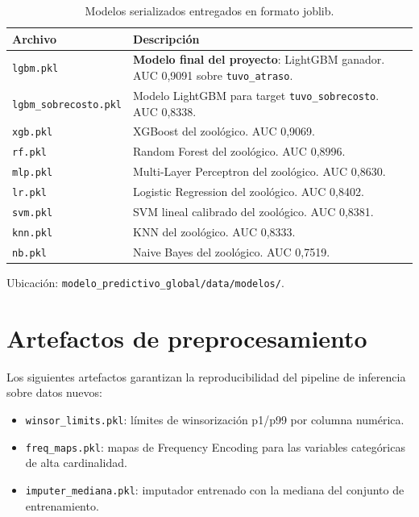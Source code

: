 \documentclass[12pt,letterpaper,oneside]{report}
\begin{document}
\begin{table}[H]
\centering
\caption{Modelos serializados entregados en formato joblib.}
\label{tab:modelos_entregados}
\small
\begin{tabular}{p{4cm}p{10cm}}
\toprule
\textbf{Archivo} & \textbf{Descripción} \\
\midrule
\texttt{lgbm.pkl} & \textbf{Modelo final del proyecto}: LightGBM ganador. AUC 0,9091 sobre \texttt{tuvo\_atraso}. \\
\texttt{lgbm\_sobrecosto.pkl} & Modelo LightGBM para target \texttt{tuvo\_sobrecosto}. AUC 0,8338. \\
\texttt{xgb.pkl} & XGBoost del zoológico. AUC 0,9069. \\
\texttt{rf.pkl} & Random Forest del zoológico. AUC 0,8996. \\
\texttt{mlp.pkl} & Multi-Layer Perceptron del zoológico. AUC 0,8630. \\
\texttt{lr.pkl} & Logistic Regression del zoológico. AUC 0,8402. \\
\texttt{svm.pkl} & SVM lineal calibrado del zoológico. AUC 0,8381. \\
\texttt{knn.pkl} & KNN del zoológico. AUC 0,8333. \\
\texttt{nb.pkl} & Naive Bayes del zoológico. AUC 0,7519. \\
\bottomrule
\end{tabular}
\end{table}

Ubicación: \texttt{modelo\_predictivo\_global/data/modelos/}.

\section{Artefactos de preprocesamiento}

Los siguientes artefactos garantizan la reproducibilidad del pipeline de
inferencia sobre datos nuevos:

\begin{itemize}
    \item \texttt{winsor\_limits.pkl}: límites de winsorización p1/p99 por
    columna numérica.
    \item \texttt{freq\_maps.pkl}: mapas de Frequency Encoding para las
    variables categóricas de alta cardinalidad.
    \item \texttt{imputer\_mediana.pkl}: imputador entrenado con la mediana
    del conjunto de entrenamiento.
\end{itemize}
\end{document}
